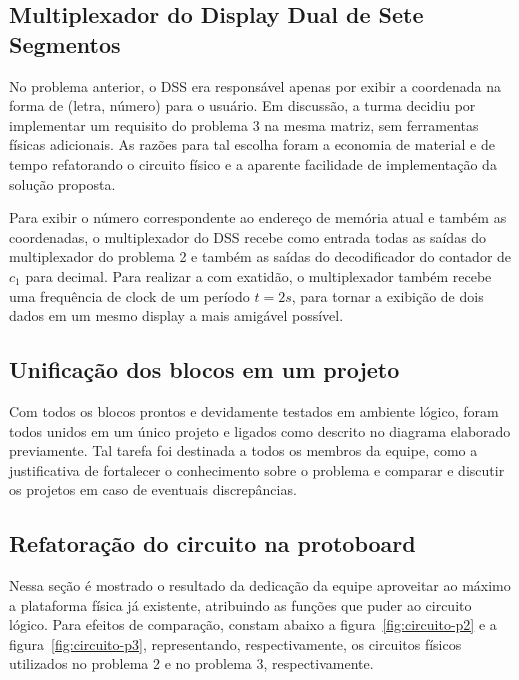 \documentclass[12pt]{article}
\begin{document}

\subsection{Multiplexador do Display Dual de Sete Segmentos} \label{sub:mux-matriz}

No problema anterior, o DSS era responsável apenas por exibir a coordenada na forma de (letra, número) para o usuário. Em discussão, a turma decidiu por implementar um requisito do problema 3 na mesma matriz, sem ferramentas físicas adicionais. As razões para tal escolha foram a economia de material e de tempo refatorando o circuito físico e a aparente facilidade de implementação da solução proposta.

Para exibir o número correspondente ao endereço de memória atual e também as coordenadas, o multiplexador do DSS recebe como entrada todas as saídas do multiplexador do problema 2 e também as saídas do decodificador do contador de $c_{1}$ para decimal. Para realizar a com exatidão, o multiplexador também recebe uma frequência de clock de um período $t=2s$, para tornar a exibição de dois dados em um mesmo display a mais amigável possível.

\subsection{Unificação dos blocos em um projeto}
Com todos os blocos prontos e devidamente testados em ambiente lógico, foram todos unidos em um único projeto e ligados como descrito no diagrama elaborado previamente. Tal tarefa foi destinada a todos os membros da equipe, como a justificativa de fortalecer o conhecimento sobre o problema e comparar e discutir os projetos em caso de eventuais discrepâncias.

\subsection{Refatoração do circuito na protoboard}

Nessa seção é mostrado o resultado da dedicação da equipe aproveitar ao máximo a plataforma física já existente, atribuindo as funções que puder ao circuito lógico. Para efeitos de comparação, constam abaixo a figura~\ref{fig:circuito-p2} e a figura~\ref{fig:circuito-p3}, representando, respectivamente, os circuitos físicos utilizados no problema 2 e no problema 3, respectivamente.
\end{document}
